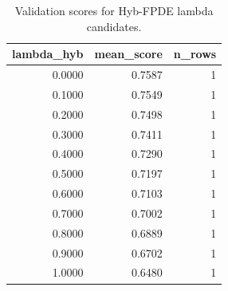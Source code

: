 \begin{table}[t]
\caption{Validation scores for Hyb-FPDE lambda candidates.}
\label{tab:lambda_distribution_computed}
\centering
\begin{tabular}{rrr}
\toprule
lambda\_hyb & mean\_score & n\_rows \\
\midrule
0.0000 & 0.7587 & 1 \\
0.1000 & 0.7549 & 1 \\
0.2000 & 0.7498 & 1 \\
0.3000 & 0.7411 & 1 \\
0.4000 & 0.7290 & 1 \\
0.5000 & 0.7197 & 1 \\
0.6000 & 0.7103 & 1 \\
0.7000 & 0.7002 & 1 \\
0.8000 & 0.6889 & 1 \\
0.9000 & 0.6702 & 1 \\
1.0000 & 0.6480 & 1 \\
\bottomrule
\end{tabular}

\end{table}
